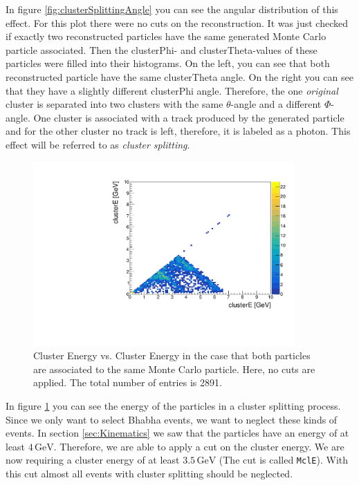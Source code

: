 \documentclass[a4paper,11pt,twosided,final,german,openbib,pdftex,listof=totoc,bibliography=totoc]{scrbook}
\begin{document}
In figure \ref{fig:clusterSplittingAngle} you can see the angular distribution of this effect. For this plot there were no cuts on the reconstruction. It was just checked if exactly two reconstructed particles have the same generated Monte Carlo particle associated. Then the clusterPhi- and clusterTheta-values of these particles were filled into their histograms. On the left, you can see that both reconstructed particle have the same clusterTheta angle. On the right you can see that they have a slightly different clusterPhi angle. Therefore, the one \textit{original} cluster  is separated into two clusters with the same $\theta$-angle and a different $\Phi$-angle. One cluster is associated with a track produced by the generated particle and for the other cluster no track is left, therefore, it is labeled as a photon. This effect will be referred to as \textit{cluster splitting}.


\begin{figure}[h!]
	\centering
	\includegraphics[width=10cm]{AnhangPlots/EEdoubleMCE}
	\caption[Cluster Splitting Energy Distribution]{Cluster Energy vs. Cluster Energy in the case that both particles are associated to the same Monte Carlo particle. Here, no cuts are applied. The total number of entries is 2891.}
	\label{fig:clusterSplittingE}
\end{figure}

In figure \ref{fig:clusterSplittingE} you can see the energy of the particles in a cluster splitting process. Since we only want to select Bhabha events, we want to neglect these kinds of events. In section \ref{sec:Kinematics} we saw that the particles have an energy of at least $4\,\textrm{GeV}$. Therefore, we are able to apply a cut on the cluster energy. We are now requiring a cluster energy of at least $3.5\,\textrm{GeV}$ (The cut is called \texttt{MclE}). With this cut almost all events with cluster splitting should be neglected.
\end{document}

